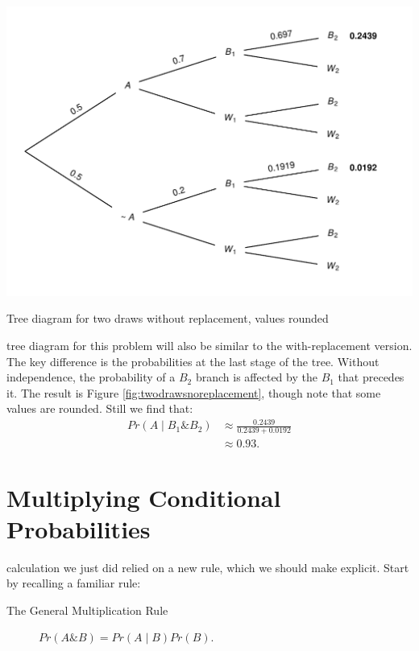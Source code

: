 \documentclass[justified]{tufte-book}
\newcommand{\given}{\mid}
\renewcommand{\wedge}{\mathbin{\&}}
\newcommand{\p}{Pr}
\theoremstyle{definition}
\theoremstyle{definition}
\theoremstyle{definition}
\theoremstyle{remark}
\begin{document}
\begin{marginfigure}
\includegraphics{_main_files/figure-latex/twodrawsnoreplacement-11} \caption[Tree diagram for two draws without replacement, values rounded]{Tree diagram for two draws without replacement, values rounded}\label{fig:twodrawsnoreplacement}
\end{marginfigure}

 tree diagram for this problem will also be similar to
the with-replacement version. The key difference is the probabilities at
the last stage of the tree. Without independence, the probability of a
\(B_2\) branch is affected by the \(B_1\) that precedes it. The result
is Figure \ref{fig:twodrawsnoreplacement}, though note that some values
are rounded. Still we find that: \[
  \begin{aligned}
     \p(A \given B_1 \wedge B_2) &\approx \frac{ 0.2439 }{ 0.2439 + 0.0192 } \\
                                 &\approx 0.93.
  \end{aligned}
\]

\hypertarget{multiplying-conditional-probabilities}{%
\section{Multiplying Conditional
Probabilities}\label{multiplying-conditional-probabilities}}

 calculation we just did relied on a new rule, which we
should make explicit. Start by recalling a familiar rule:

\begin{description}
\item[The General Multiplication Rule]
\(\p(A \wedge B) = \p(A \given B) \p(B).\)
\end{description}
\end{document}
